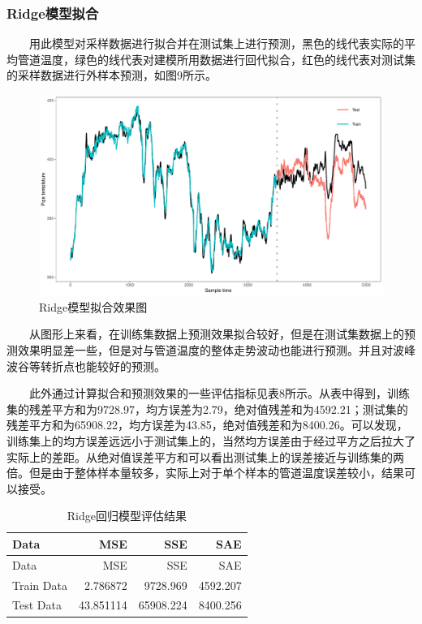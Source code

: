 \documentclass[
]{article}
\begin{document}
\hypertarget{ridgeux6a21ux578bux62dfux5408}{%
\subsubsection{Ridge模型拟合}\label{ridgeux6a21ux578bux62dfux5408}}

  用此模型对采样数据进行拟合并在测试集上进行预测，黑色的线代表实际的平均管道温度，绿色的线代表对建模所用数据进行回代拟合，红色的线代表对测试集的采样数据进行外样本预测，如图9所示。

\begin{figure}

{\centering \includegraphics{TJRJCP_DuXingx_202105_files/figure-latex/unnamed-chunk-25-1} 

}

\caption{Ridge模型拟合效果图}\label{fig:unnamed-chunk-25}
\end{figure}

  从图形上来看，在训练集数据上预测效果拟合较好，但是在测试集数据上的预测效果明显差一些，但是对与管道温度的整体走势波动也能进行预测。并且对波峰波谷等转折点也能较好的预测。

  此外通过计算拟合和预测效果的一些评估指标见表8所示。从表中得到，训练集的残差平方和为9728.97，均方误差为2.79，绝对值残差和为4592.21；测试集的残差平方和为65908.22，均方误差为43.85，绝对值残差和为8400.26。可以发现，训练集上的均方误差远远小于测试集上的，当然均方误差由于经过平方之后拉大了实际上的差距。从绝对值误差平方和可以看出测试集上的误差接近与训练集的两倍。但是由于整体样本量较多，实际上对于单个样本的管道温度误差较小，结果可以接受。

\begin{longtable}[]{@{}lrrr@{}}
\caption{Ridge回归模型评估结果}\tabularnewline
\toprule
Data & MSE & SSE & SAE\tabularnewline
\midrule
\endfirsthead
\toprule
Data & MSE & SSE & SAE\tabularnewline
\midrule
\endhead
Train Data & 2.786872 & 9728.969 & 4592.207\tabularnewline
Test Data & 43.851114 & 65908.224 & 8400.256\tabularnewline
\bottomrule
\end{longtable}
\end{document}
